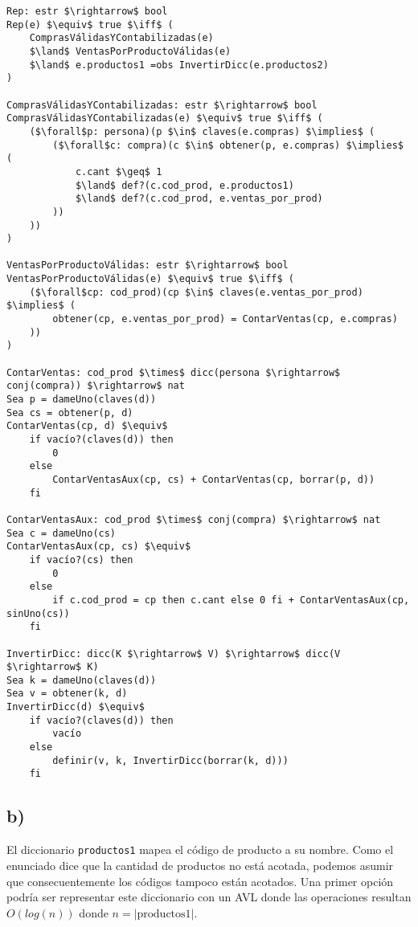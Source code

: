 \begin{lstlisting}
Rep: estr $\rightarrow$ bool
Rep(e) $\equiv$ true $\iff$ (
    ComprasVálidasYContabilizadas(e)
    $\land$ VentasPorProductoVálidas(e)
    $\land$ e.productos1 =obs InvertirDicc(e.productos2)
)

ComprasVálidasYContabilizadas: estr $\rightarrow$ bool
ComprasVálidasYContabilizadas(e) $\equiv$ true $\iff$ (
    ($\forall$p: persona)(p $\in$ claves(e.compras) $\implies$ (
        ($\forall$c: compra)(c $\in$ obtener(p, e.compras) $\implies$ (
            c.cant $\geq$ 1
            $\land$ def?(c.cod_prod, e.productos1)
            $\land$ def?(c.cod_prod, e.ventas_por_prod)
        ))
    ))
)

VentasPorProductoVálidas: estr $\rightarrow$ bool
VentasPorProductoVálidas(e) $\equiv$ true $\iff$ (
    ($\forall$cp: cod_prod)(cp $\in$ claves(e.ventas_por_prod) $\implies$ (
        obtener(cp, e.ventas_por_prod) = ContarVentas(cp, e.compras)
    ))
)

ContarVentas: cod_prod $\times$ dicc(persona $\rightarrow$ conj(compra)) $\rightarrow$ nat
Sea p = dameUno(claves(d))
Sea cs = obtener(p, d)
ContarVentas(cp, d) $\equiv$
    if vacío?(claves(d)) then
        0
    else
        ContarVentasAux(cp, cs) + ContarVentas(cp, borrar(p, d))
    fi

ContarVentasAux: cod_prod $\times$ conj(compra) $\rightarrow$ nat
Sea c = dameUno(cs)
ContarVentasAux(cp, cs) $\equiv$
    if vacío?(cs) then
        0
    else
        if c.cod_prod = cp then c.cant else 0 fi + ContarVentasAux(cp, sinUno(cs))
    fi

InvertirDicc: dicc(K $\rightarrow$ V) $\rightarrow$ dicc(V $\rightarrow$ K)
Sea k = dameUno(claves(d))
Sea v = obtener(k, d)
InvertirDicc(d) $\equiv$
    if vacío?(claves(d)) then
        vacío
    else
        definir(v, k, InvertirDicc(borrar(k, d)))
    fi
\end{lstlisting}

\subsection*{b)}

El diccionario \lstinline{productos1} mapea el código de producto a su nombre. Como el enunciado dice que la cantidad de productos no está acotada, podemos asumir que consecuentemente los códigos tampoco están acotados. Una primer opción podría ser representar este diccionario con un AVL donde las operaciones resultan $O(log(n))$ donde $n = |\text{productos1}|$.


